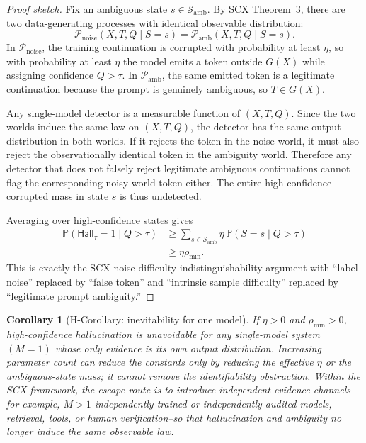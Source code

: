 \documentclass[11pt,twocolumn]{article}
\newtheorem{corollary}[theorem]{Corollary}
\renewcommand{\P}{\mathbb{P}}
\newcommand{\cS}{\mathcal{S}}
\begin{document}
\begin{proof}[Proof sketch]
Fix an ambiguous state $s \in \cS_{\mathrm{amb}}$. By SCX Theorem~3, there are two data-generating processes with identical observable distribution:
\[
\mathcal{P}_{\mathrm{noise}}(X,T,Q \mid S=s)
=
\mathcal{P}_{\mathrm{amb}}(X,T,Q \mid S=s).
\]
In $\mathcal{P}_{\mathrm{noise}}$, the training continuation is corrupted with probability at least $\eta$, so with probability at least $\eta$ the model emits a token outside $G(X)$ while assigning confidence $Q>\tau$. In $\mathcal{P}_{\mathrm{amb}}$, the same emitted token is a legitimate continuation because the prompt is genuinely ambiguous, so $T\in G(X)$.

Any single-model detector is a measurable function of $(X,T,Q)$. Since the two worlds induce the same law on $(X,T,Q)$, the detector has the same output distribution in both worlds. If it rejects the token in the noise world, it must also reject the observationally identical token in the ambiguity world. Therefore any detector that does not falsely reject legitimate ambiguous continuations cannot flag the corresponding noisy-world token either. The entire high-confidence corrupted mass in state $s$ is thus undetected.

Averaging over high-confidence states gives
\[
\begin{aligned}
\P(\mathsf{Hall}_\tau=1 \mid Q>\tau)
&\geq
\sum_{s\in\cS_{\mathrm{amb}}}
\eta\,\P(S=s\mid Q>\tau)\\
&\geq
\eta \rho_{\min}.
\end{aligned}
\]
This is exactly the SCX noise-difficulty indistinguishability argument with ``label noise'' replaced by ``false token'' and ``intrinsic sample difficulty'' replaced by ``legitimate prompt ambiguity.'' \qedhere
\end{proof}

\begin{corollary}[H-Corollary: inevitability for one model]
\label{cor:h_inevitability}
If $\eta>0$ and $\rho_{\min}>0$, high-confidence hallucination is unavoidable for any single-model system $(M=1)$ whose only evidence is its own output distribution. Increasing parameter count can reduce the constants only by reducing the effective $\eta$ or the ambiguous-state mass; it cannot remove the identifiability obstruction. Within the SCX framework, the escape route is to introduce independent evidence channels--for example, $M>1$ independently trained or independently audited models, retrieval, tools, or human verification--so that hallucination and ambiguity no longer induce the same observable law.
\end{corollary}
\end{document}

